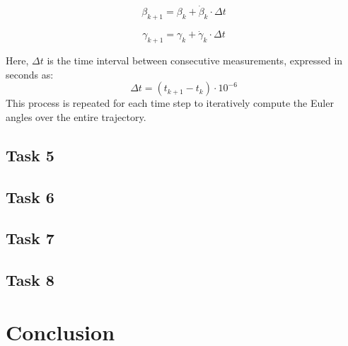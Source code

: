 \documentclass[12pt]{article}
\begin{document}
\begin{equation}
\label{eq:beta_discrete}
\beta_{k+1} = \beta_k + \dot{\beta}_k \cdot \Delta t
\end{equation}

\begin{equation}
\label{eq:gamma_discrete}
\gamma_{k+1} = \gamma_k + \dot{\gamma}_k \cdot \Delta t
\end{equation}

Here, \( \Delta t \) is the time interval between consecutive measurements, expressed in seconds as:
\[
\Delta t = (t_{k+1} - t_k) \cdot 10^{-6}
\]
This process is repeated for each time step to iteratively compute the Euler angles over the entire trajectory.

\subsection{Task 5}


\subsection{Task 6}


\subsection{Task 7}


\subsection{Task 8}

\section{Conclusion}






\appendix  
\clearpage
\addappheadtotoc 
\appendixpage 
\end{document}

